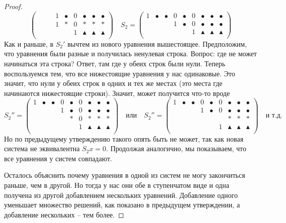 \begin{proof}
\[\begin{pmatrix}
{}&{}&{}&{1}&{\bullet}&{0}&{\bullet}&{\bullet}&{\bullet}\\
{}&{}&{}&{1}&{*}&{0}&{*}&{*}&{*}\\
{}&{}&{}&{}&{}&{1}&{\blacktriangle}&{\blacktriangle}&{\blacktriangle}\\
\end{pmatrix}\quad
S_2 = 
\begin{pmatrix}
{1}&{\bullet}&{\bullet}&{0}&{\bullet}&{0}&{\bullet}&{\bullet}&{\bullet}\\
{}&{}&{}&{1}&{\bullet}&{0}&{\bullet}&{\bullet}&{\bullet}\\
{}&{}&{}&{}&{}&{1}&{\blacktriangle}&{\blacktriangle}&{\blacktriangle}\\
\end{pmatrix}
\]
Как и раньше, в $S_2'$ вычтем из нового уравнения вышестоящее.
Предположим, что уравнения были разные и получилась ненулевая строка.
Вопрос: где не может начинаться эта строка?
Ответ, там где у обеих строк были нули.
Теперь воспользуемся тем, что все нижестоящие уравнения у нас одинаковые.
Это значит, что нули у обеих строк в одних и тех же местах (это места где начинаются нижестоящие строки).
Значит, может получится что-то вроде
\[
S_2'' = 
\begin{pmatrix}
{1}&{\bullet}&{\bullet}&{0}&{\bullet}&{0}&{\bullet}&{\bullet}&{\bullet}\\
{}&{}&{}&{1}&{\bullet}&{0}&{\bullet}&{\bullet}&{\bullet}\\
{}&{}&{}&{}&{*}&{0}&{*}&{*}&{*}\\
{}&{}&{}&{}&{}&{1}&{\blacktriangle}&{\blacktriangle}&{\blacktriangle}\\
\end{pmatrix}\quad\text{или}\quad
S_2'' = 
\begin{pmatrix}
{1}&{\bullet}&{\bullet}&{0}&{\bullet}&{0}&{\bullet}&{\bullet}&{\bullet}\\
{}&{}&{}&{1}&{\bullet}&{0}&{\bullet}&{\bullet}&{\bullet}\\
{}&{}&{}&{}&{}&{}&{*}&{*}&{*}\\
{}&{}&{}&{}&{}&{1}&{\blacktriangle}&{\blacktriangle}&{\blacktriangle}\\
\end{pmatrix}\quad\text{и т.д.}
\]
Но по предыдущему утверждению такого опять быть не может, так как новая система не эквивалентна $S_2 x = 0$.
Продолжая аналогично, мы показываем, что все уравнения у систем совпадают.

Осталось объяснить почему уравнения в одной из систем не могу закончиться раньше, чем в другой.
Но тогда у нас они обе в ступенчатом виде и одна получена из другой добавлением нескольких уравнений.
Добавление одного уменьшает множество решений, как показано в предыдущем утверждении, а добавление нескольких -- тем более.
\end{proof}

